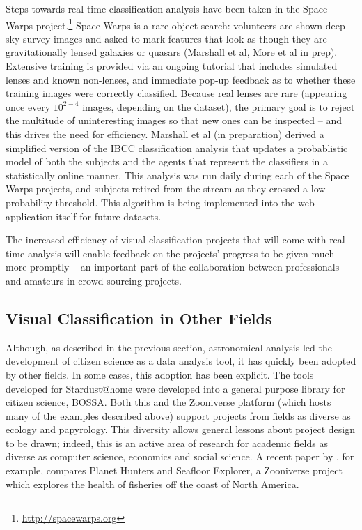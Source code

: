 \documentclass{ar2e}
\begin{document}
Steps towards real-time classification analysis have been taken in the Space
Warps project.\footnote{\url{http://spacewarps.org}} 
Space Warps is a rare object search: volunteers are shown deep
sky survey images and asked to mark features that look as though they are
gravitationally lensed galaxies or quasars (Marshall et al, More et al in prep).
Extensive training is
provided via an ongoing tutorial that includes simulated lenses and known
non-lenses, and immediate pop-up feedback as to whether these training images
were correctly classified. Because real lenses are rare (appearing once every
$10^{2-4}$ images, depending on the dataset), the primary goal is to reject the
multitude of uninteresting images so that new ones can be inspected -- and this
drives the need for efficiency. Marshall et al (in preparation) derived a
simplified version of the IBCC classification analysis that updates a
probablistic model of both the subjects and the agents that represent the
classifiers in a statistically online manner. This
analysis was run daily during each of the Space Warps projects, and subjects
retired from the stream as they crossed a low probability threshold. This
algorithm is being implemented into the web application itself for future
datasets. 

The increased  efficiency of visual classification projects that will come with
real-time analysis will enable feedback on the projects' progress to be given
much more promptly -- an important part of the collaboration between
professionals and amateurs in crowd-sourcing projects.



\subsection{Visual Classification in Other Fields}
\label{sec:class:non-astro}

Although, as described in the previous section, astronomical analysis led the
development of citizen science as a data analysis tool, it has quickly been
adopted by other fields. In some cases, this adoption has been explicit. The
tools developed for Stardust@home were developed into a general purpose
library for citizen science, BOSSA.
Both this and the Zooniverse platform (which hosts many of the examples
described above) support projects from fields as diverse as ecology and
papyrology. This diversity allows general lessons about project
design to be drawn; indeed, this is an active area of research for academic
fields as diverse as computer science, economics and social science. A recent paper
by \citet{Crowston}, for example, compares Planet Hunters and Seafloor Explorer, 
a Zooniverse project which explores the health of fisheries off the coast of
North America. 
\end{document}
